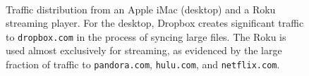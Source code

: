 \begin{figure}[t]
  \begin{minipage}{\linewidth}
\centering  {}
\centering  {}\\
  \caption{Traffic distribution from an Apple iMac (desktop) and a Roku streaming player. 
    For the desktop, Dropbox creates significant traffic to
    {\tt dropbox.com} in the process of syncing large files. The Roku is used almost exclusively for streaming,
    as evidenced by the large fraction of traffic to {\tt pandora.com}, {\tt hulu.com}, and {\tt netflix.com}.}
  \label{fig:apple}
  \end{minipage}
\end{figure}


